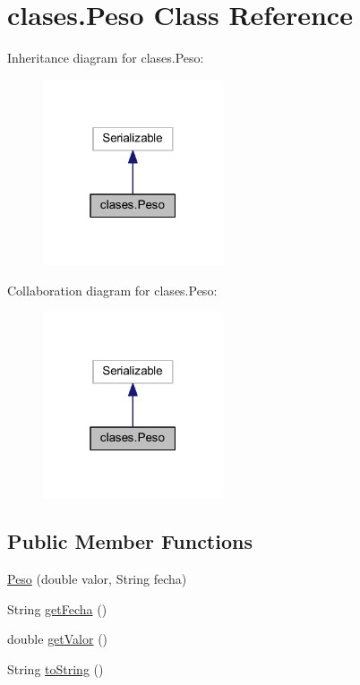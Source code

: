\hypertarget{classclases_1_1_peso}{}\section{clases.\+Peso Class Reference}
\label{classclases_1_1_peso}


Inheritance diagram for clases.\+Peso\+:
\nopagebreak
\begin{figure}[H]
\begin{center}
\leavevmode
\includegraphics[width=151pt]{classclases_1_1_peso__inherit__graph}
\end{center}
\end{figure}


Collaboration diagram for clases.\+Peso\+:
\nopagebreak
\begin{figure}[H]
\begin{center}
\leavevmode
\includegraphics[width=151pt]{classclases_1_1_peso__coll__graph}
\end{center}
\end{figure}
\subsection*{Public Member Functions}
\begin{DoxyCompactItemize}
\item 
\mbox{\hyperlink{classclases_1_1_peso_a25ffe8b256b58b356e0534d2aa67d0e3}{Peso}} (double valor, String fecha)
\item 
String \mbox{\hyperlink{classclases_1_1_peso_afbe5ae3ccb31533c1bb7782c869a4e93}{get\+Fecha}} ()
\item 
double \mbox{\hyperlink{classclases_1_1_peso_a1a515ee0df44d235337949f360ddd60a}{get\+Valor}} ()
\item 
String \mbox{\hyperlink{classclases_1_1_peso_a141d91b62bd2ad4d18e263b2042d6368}{to\+String}} ()
\end{DoxyCompactItemize}



